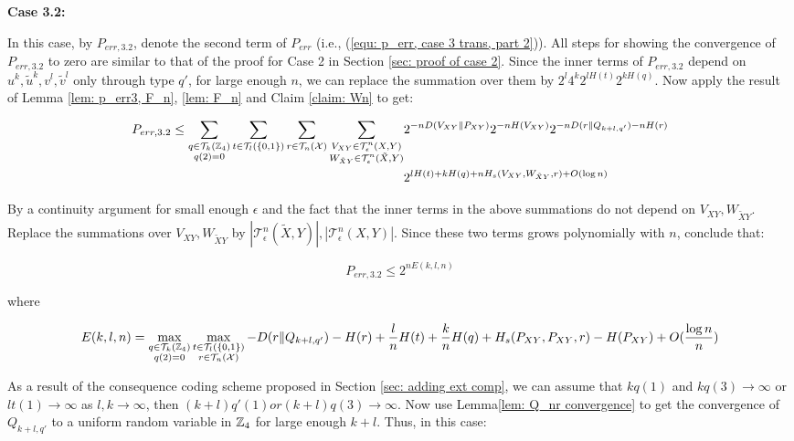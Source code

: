 \textbf{Case 3.2:} 

In this case, by $P_{err, 3.2}$, denote the second term of $P_{err}$ (i.e., (\ref{equ: p_err, case 3 trans, part 2})). All steps for showing the convergence of $P_{err, 3.2}$ to zero are similar to that of the proof for Case 2 in Section \ref{sec: proof of case 2}. Since the inner terms of $P_{err, 3.2}$ depend on $u^k,\tilde{u}^k, v^l, \tilde{v}^l$ only through type $q'$, for large enough $n$, we can replace the summation over them by $2^l4^k 2^{lH(t)}2^{kH(q)}$. Now apply the result of Lemma \ref{lem: p_err3, F_n}, \ref{lem: F_n} and Claim \ref{claim: Wn} to get:


 \begin{align}
P_{err, 3.2} \leq \sum_{\substack{q\in \mathcal{T}_k(\mathbb{Z}_4)\\q(2)=0}}\sum_{t\in \mathcal{T}_l(\{0,1 \})}\sum_{r \in \mathcal{T}_n(\mathcal{X}) }  \sum_{\substack{V_{XY}\in \mathcal{T}_\epsilon^n(X,Y)\\ W_{\tilde{X}Y}\in  \mathcal{T}_\epsilon^n(\tilde{X},Y) }}&  2^{-nD(V_{XY}\| P_{XY})} 2^{-nH(V_{XY})} 2^{-nD(r\| Q_{k+l,q'})-nH(r)}\\
&2^{lH(t)+kH(q)+nH_{s}(V_{XY},W_{\tilde{X}Y},r)+O(\log n)}
\end{align} 

By a continuity argument for small enough $\epsilon$ and the fact that the inner terms in the above summations do not depend on $V_{XY}, W_{\tilde{X}Y} $. Replace the summations over $V_{XY}, W_{\tilde{X}Y} $ by $|\mathcal{T}_\epsilon^n(\tilde{X},Y)|, |\mathcal{T}_\epsilon^n(X,Y)|$. Since these two terms grows polynomially with $n$, conclude that:

\begin{equation*}
P_{err, 3.2} \leq 2^{nE(k,l,n)}
\end{equation*}

where

\begin{align*}
E(k,l,n)= \max_{\substack{q\in \mathcal{T}_k(\mathbb{Z}_4)\\q(2)=0}} \max_{\substack{t\in \mathcal{T}_l(\{0,1 \})\\ r \in \mathcal{T}_n(\mathcal{X})}} -D(r\| Q_{k+l,q'})-H(r)+\frac{l}{n} H(t)+\frac{k}{n}H(q)+H_{s}(P_{XY},P_{XY},r)-H(P_{XY})+O( \frac{\log n}{n})
\end{align*}

As a result of the consequence coding scheme proposed in Section \ref{sec: adding ext comp}, we can assume that $k q(1)$ and $kq(3)\rightarrow \infty$ or $l t(1)\rightarrow \infty$  as $l, k\rightarrow \infty$, then $(k+l)q'(1) or (k+l)q(3) \rightarrow \infty$. Now use Lemma\ref{lem: Q_nr convergence} to get the convergence of $Q_{k+l,q'}$ to a uniform random variable in $\mathbb{Z}_4$ for large enough $k+l$. Thus, in this case:


